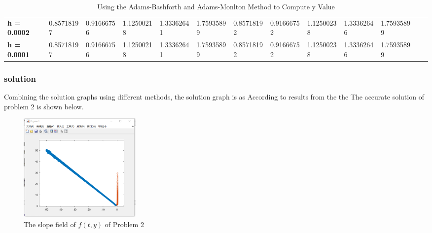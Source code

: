 \documentclass[a4paper]{article}
\begin{document}
\begin{table}[H]
{\begin{tabular}{@{}lllllllllllll@{}}
				\textbf{h = 0.0002}             & 0.85718197                             & 0.91666756                             & 1.12500218                            & 1.33362641                            & 1.75935899                                                            & 0.85718192                             & 0.91666752                             & 1.12500238                            & 1.33362646       & 1.75935899                  \\
				\textbf{h = 0.0001}             & 0.85718197                             & 0.91666756                             & 1.12500218                            & 1.33362641                            & 1.75935899                                                            & 0.85718192                             & 0.91666752                             & 1.12500238                            & 1.33362646       & 1.75935899         \\
				\bottomrule
			\end{tabular}%
		}
		\caption{Using the Adams-Bashforth and Adams-Monlton Method to Compute y Value }
		\label{tab:IVP2_AD}
	\end{table}
	
	\subsubsection{solution}
	Combining the solution graphs using different methods, the solution graph is as
	According to results from the the The accurate solution of problem 2 is shown below.
	
	\begin{figure}[H]
		\centering
		\includegraphics[width=6cm]{img/IVP_2.png}
		\caption{\label{IVP_2} The slope field of $f(t, y)$ of Problem 2}
	\end{figure}
	
	
\end{document}
